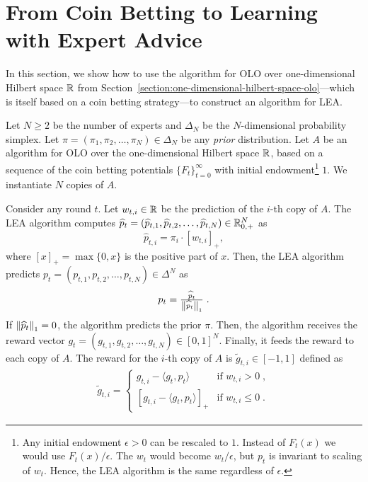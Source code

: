 \section{From Coin Betting to Learning with Expert Advice}
\label{section:reduction-experts}

In this section, we show how to use the algorithm for OLO over one-dimensional
Hilbert space $\mathbb{R}$ from
Section~\ref{section:one-dimensional-hilbert-space-olo}---which is itself based
on a coin betting strategy---to construct an algorithm for \ac{LEA}.

\vspace{-0.05cm}

Let $N \ge 2$ be the number of experts and $\Delta_N$ be the $N$-dimensional
probability simplex. Let $\pi = (\pi_1, \pi_2, \dots, \pi_N) \in \Delta_N$ be
any \emph{prior} distribution. Let $A$ be an algorithm for OLO over
the one-dimensional Hilbert space $\mathbb{R}$, based on a sequence of the coin betting
potentials $\{F_t\}_{t=0}^\infty$ with initial endowment\footnote{Any initial
endowment $\epsilon > 0$ can be rescaled to $1$. Instead of $F_t(x)$ we would
use $F_t(x)/\epsilon$. The $w_t$ would become $w_t/\epsilon$, but $p_t$ is
invariant to scaling of $w_t$. Hence, the LEA algorithm is the same regardless
of $\epsilon$.} $1$. We instantiate $N$ copies of $A$.

\vspace{-0.05cm}

Consider any round $t$. Let $w_{t,i} \in \mathbb{R}$ be the prediction of the $i$-th copy of
$A$. The LEA algorithm computes $\widehat p_t = (\widehat p_{t,1}, \widehat
p_{t,2}, \dots, \widehat p_{t,N}) \in \mathbb{R}_{0,+}^N$ as
\begin{equation}
\label{eq:phat}
\widehat p_{t,i} = \pi_i \cdot [w_{t,i}]_+,
\end{equation}
where $[x]_+ = \max\{0,x\}$ is the positive part of $x$. Then, the LEA
algorithm predicts $p_t = (p_{t,1}, p_{t,2}, \dots, p_{t,N}) \in \Delta^N$ as
\begin{equation}
\label{eq:preds_experts}
p_t = \tfrac{\widehat p_t}{\left\|{\widehat p_t}\right\|_1} \; .
\end{equation}
If $\left\|{\widehat p_t}\right\|_1 = 0$, the algorithm predicts the prior $\pi$.
Then, the algorithm receives the reward vector
$g_t = (g_{t,1}, g_{t,2}, \dots, g_{t,N}) \in [0,1]^N$. Finally, it
feeds the reward to each copy of $A$. The reward for the $i$-th copy of $A$ is $\widetilde g_{t,i} \in
[-1,1]$ defined as
\begin{align}
\label{eq:gradients_experts_reduction}
\widetilde g_{t,i} =
\begin{cases}
g_{t,i} - \langle g_t, p_t \rangle & \text{if } w_{t,i} > 0 \; , \\
\left[g_{t,i} - \langle g_t, p_t \rangle \right]_+ & \text{if } w_{t,i} \le 0 \; .
\end{cases}
\end{align}

